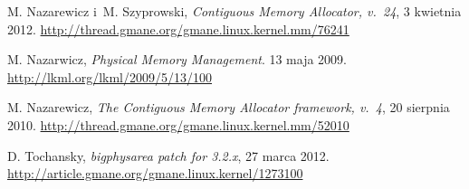 \begin{thebibliography}{9}


  M. Nazarewicz i~M. Szyprowski,
  \emph{Contiguous Memory Allocator, v.\ 24},
  3 kwietnia 2012.
  \url{http://thread.gmane.org/gmane.linux.kernel.mm/76241}

  M. Nazarwicz,
  \emph{Physical Memory Management}.
  13 maja 2009.
  \url{http://lkml.org/lkml/2009/5/13/100}

  M. Nazarewicz,
  \emph{The Contiguous Memory Allocator framework, v.\ 4},
  20 sierpnia 2010.
  \url{http://thread.gmane.org/gmane.linux.kernel.mm/52010}

  D. Tochansky,
  \emph{bigphysarea patch for 3.2.x},
  27 marca 2012.
  \url{http://article.gmane.org/gmane.linux.kernel/1273100}


\end{thebibliography}
